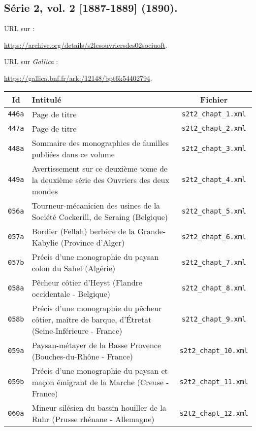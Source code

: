 \subsection{Série 2, vol. 2 [1887-1889] (1890).}
\label{mappings2t2}

URL sur \ia{} : 

\url{https://archive.org/details/s2lesouvriersdes02sociuoft}.

URL sur \textit{Gallica} : 

\url{https://gallica.bnf.fr/ark:/12148/bpt6k54402794}.

\begin{center}
\begin{longtable}{ | c | p{9.5cm} | c | }
\hline
Id & Intitulé & Fichier \\ \hline
\texttt{446a} & Page de titre & \texttt{s2t2\_chapt\_1.xml} \\ \hline
\texttt{447a} & Page de titre & \texttt{s2t2\_chapt\_2.xml} \\ \hline
\texttt{448a} & Sommaire des monographies de familles publiées dans ce volume & \texttt{s2t2\_chapt\_3.xml} \\ \hline
\texttt{449a} & Avertissement sur ce deuxième tome de la deuxième série des Ouvriers des deux mondes & \texttt{s2t2\_chapt\_4.xml} \\ \hline
\texttt{056a} & Tourneur-mécanicien des usines de la Société Cockerill, de Seraing (Belgique) & \texttt{s2t2\_chapt\_5.xml} \\ \hline
\texttt{057a} & Bordier (Fellah) berbère de la Grande-Kabylie (Province d'Alger) & \texttt{s2t2\_chapt\_6.xml} \\ \hline
\texttt{057b} & Précis d'une monographie du paysan colon du Sahel (Algérie) & \texttt{s2t2\_chapt\_7.xml} \\ \hline
\texttt{058a} & Pêcheur côtier d'Heyst (Flandre occidentale - Belgique) & \texttt{s2t2\_chapt\_8.xml} \\ \hline
\texttt{058b} & Précis d'une monographie du pêcheur côtier, maître de barque, d'Étretat (Seine-Inférieure - France) & \texttt{s2t2\_chapt\_9.xml} \\ \hline
\texttt{059a} & Paysan-métayer de la Basse Provence (Bouches-du-Rhône - France) & \texttt{s2t2\_chapt\_10.xml} \\ \hline
\texttt{059b} & Précis d'une monographie du paysan et maçon émigrant de la Marche (Creuse - France) & \texttt{s2t2\_chapt\_11.xml} \\ \hline
\texttt{060a} & Mineur silésien du bassin houiller de la Ruhr (Prusse rhénane - Allemagne) & \texttt{s2t2\_chapt\_12.xml} \\ \hline

\end{longtable}
\end{center}
